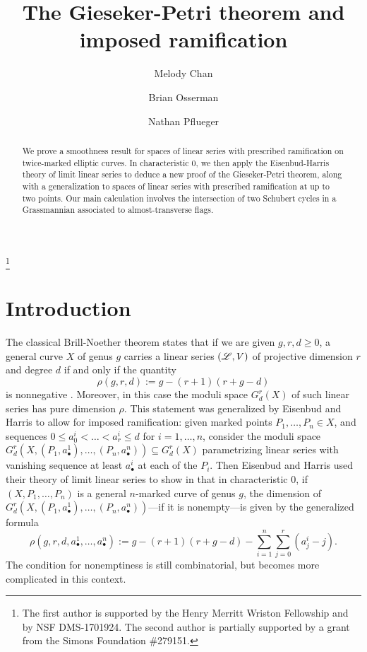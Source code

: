 \documentclass{amsart}
\begin{document}
\title{The Gieseker-Petri theorem and imposed ramification}
\author{Melody Chan}
\author{Brian Osserman}
\author{Nathan Pflueger}
\begin{abstract} We prove a smoothness result for spaces of linear series
with prescribed ramification on twice-marked elliptic curves. In
characteristic $0$, we then
apply the Eisenbud-Harris theory of limit linear series to deduce a new 
proof of the Gieseker-Petri theorem, along with a generalization to spaces 
of linear series with prescribed ramification at up to two points. Our
main calculation involves the intersection of two Schubert cycles in a
Grassmannian associated to almost-transverse flags.
\end{abstract}


\thanks{The first author is supported by the Henry Merritt Wriston 
Fellowship and by NSF DMS-1701924. The second author is partially supported 
by a grant from the Simons Foundation \#279151.}

\maketitle


\section{Introduction}
The classical Brill-Noether theorem states that if we are given 
$g,r,d \geq 0$, a general curve $X$ of genus $g$ carries a linear series
$({\mathscr L},V)$ of projective dimension $r$ and degree $d$ if and only if the quantity
$$\rho(g,r,d):=g-(r+1)(r+g-d)$$
is nonnegative \cite{g-h1}. Moreover, in this case 
the moduli space $G^r_d(X)$ of such linear series has pure dimension
$\rho$. This statement was generalized by Eisenbud and Harris
to allow for imposed ramification: given marked points 
$P_1,\dots,P_n \in X$, and sequences $0\le a^i_0<\dots<a^i_r \leq d$ for
$i=1,\dots,n$, consider the moduli space 
$G^r_d(X,(P_1,a^1_{\bullet}),\dots,(P_n,a^n_{\bullet})) \subseteq
G^r_d(X)$ parametrizing linear series with vanishing sequence at least
$a^i_{\bullet}$ at each of the $P_i$. Then Eisenbud and Harris used their
theory of limit linear series to show in \cite{e-h1}
that in characteristic $0$, if $(X,P_1,\dots,P_n)$ is a general $n$-marked 
curve of genus $g$, the dimension of
$G^r_d(X,(P_1,a^1_{\bullet}),\dots,(P_n,a^n_{\bullet}))$---if it is 
nonempty---is given by the generalized formula
$$\rho(g,r,d,a^1_\bullet,\ldots,a^n_\bullet):=g-(r+1)(r+g-d)-\sum_{i=1}^n \sum_{j=0}^r (a^i_j-j).$$
The condition for nonemptiness is still combinatorial, but becomes more 
complicated in this context. 
\end{document}
